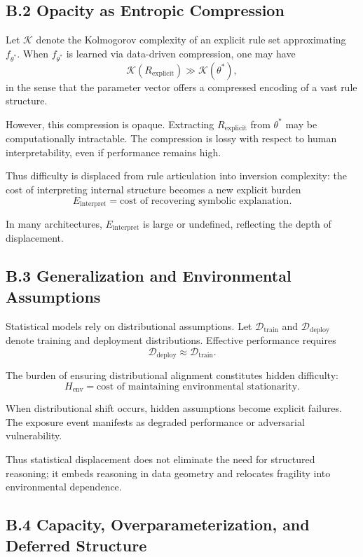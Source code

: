\documentclass[11pt]{article}
\begin{document}
\subsection{B.2 Opacity as Entropic Compression}

Let $\mathcal{K}$ denote the Kolmogorov complexity of an explicit rule set approximating $f_{\theta^*}$. When $f_{\theta^*}$ is learned via data-driven compression, one may have
\[
\mathcal{K}(R_{\text{explicit}}) \gg \mathcal{K}(\theta^*),
\]
in the sense that the parameter vector offers a compressed encoding of a vast rule structure.

However, this compression is opaque. Extracting $R_{\text{explicit}}$ from $\theta^*$ may be computationally intractable. The compression is lossy with respect to human interpretability, even if performance remains high.

Thus difficulty is displaced from rule articulation into inversion complexity: the cost of interpreting internal structure becomes a new explicit burden
\[
E_{\text{interpret}} = \text{cost of recovering symbolic explanation}.
\]

In many architectures, $E_{\text{interpret}}$ is large or undefined, reflecting the depth of displacement.

\subsection{B.3 Generalization and Environmental Assumptions}

Statistical models rely on distributional assumptions. Let $\mathcal{D}_{\text{train}}$ and $\mathcal{D}_{\text{deploy}}$ denote training and deployment distributions. Effective performance requires
\[
\mathcal{D}_{\text{deploy}} \approx \mathcal{D}_{\text{train}}.
\]

The burden of ensuring distributional alignment constitutes hidden difficulty:
\[
H_{\text{env}} = \text{cost of maintaining environmental stationarity}.
\]

When distributional shift occurs, hidden assumptions become explicit failures. The exposure event manifests as degraded performance or adversarial vulnerability.

Thus statistical displacement does not eliminate the need for structured reasoning; it embeds reasoning in data geometry and relocates fragility into environmental dependence.

\subsection{B.4 Capacity, Overparameterization, and Deferred Structure}
\end{document}

